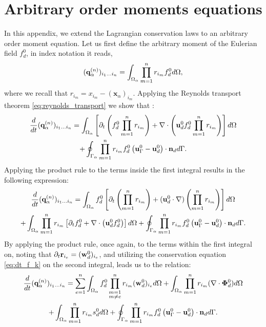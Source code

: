
\section{Arbitrary order moments equations}
\label{ap:Moments_equations}
In this appendix, we extend the Lagrangian conservation laws to an arbitrary order moment equation. 
Let us first define the arbitrary moment of the Eulerian field $f_d^0$, in index notation it reads, 
\begin{equation*}
    (\textbf{q}_\alpha^{(n)})_{i_1\ldots i_n}
    = \int_{\Omega_{\alpha}} 
    \prod_{m=1}^{n} r_{i_m} f_d^0 
     d\Omega, 
\end{equation*}
where we recall that $r_{i_m} = x_{i_m} - (\textbf{x}_\alpha)_{i_m}$. 
Applying the Reynolds transport theorem \eqref{eq:reynolds_transport} we show that :
\begin{multline}
    \frac{d}{dt} {(\textbf{q}_\alpha^{(n)})_{i_1\ldots i_n}}
    =\int_{\Omega_{\alpha}} 
        \left[ \partial_t \left(f_d^0 \prod_{m=1}^{n} r_{i_m}\right) 
    + \mathbf{\nabla}\cdot \left(\textbf{u}_d^0 f_d^0 \prod_{m=1}^{n} r_{i_m}\right) \right]
     d\Omega\\
    +\oint_{\Gamma_{\alpha}}  \prod_{m=1}^{n} r_{i_m} f_d^0 \left(\textbf{u}_\Gamma^0 - \textbf{u}_d^0\right)\cdot \textbf{n}_d  d\Gamma. 
\end{multline}
Applying the product rule to the terms inside the first integral results in the following expression: 
\begin{multline}
    \frac{d}{dt} {(\textbf{q}_\alpha^{(n)})_{i_1\ldots i_n}}
    =\int_{\Omega_{\alpha}}  
        f_d^0 \left[ \partial_t \left(\prod_{m=1}^{n} r_{i_m}\right) 
        + (\textbf{u}_d^0\cdot \mathbf{\nabla}) \left( \prod_{m=1}^{n} r_{i_m}\right) \right]
     d\Omega\\
    +\int_{\Omega_{\alpha}}  
        \prod_{m=1}^{n} r_{i_m} 
        \left[ \partial_t f_d^0
    +  \mathbf{\nabla}\cdot \left(\textbf{u}_d^0 f_d^0 \right) \right]
     d\Omega
    +\oint_{\Gamma_{\alpha}}  \prod_{m=1}^{n} r_{i_m} f_d^0 \left(\textbf{u}_\Gamma^0 - \textbf{u}_d^0\right)\cdot \textbf{n}_d  d\Gamma. 
\end{multline}
By applying the product rule, once again, to the terms within the first integral on, noting that $\partial_t \textbf{r}_{i_e} = (\textbf{w}_d^0)_{i_e}$, and utilizing the conservation equation \eqref{eq:dt_f_k} on the second integral, leads us to the relation: 
\begin{multline}
    \frac{d}{dt} {(\textbf{q}_\alpha^{(n)})_{i_1\ldots i_n}}
    = \sum_{e=1}^{n} \int_{\Omega_{\alpha}}  
        f_d^0 \prod^{n}_{\substack{ m=1 \\   m \neq e}} r_{i_m} (\textbf{w}_d^0)_{i_e}
         d\Omega
    +\int_{\Omega_{\alpha}} \prod_{m=1}^{n} r_{i_m} (\mathbf{\nabla}\cdot\bm{\Phi}_d^0) d\Omega\\
    + \int_{\Omega_{\alpha}}  \prod_{m=1}^{n} r_{i_m} s_d^0 d\Omega
    +\oint_{\Gamma_{\alpha}}  \prod_{m=1}^{n} r_{i_m} f_d^0 \left(\textbf{u}_\Gamma^0 - \textbf{u}_d^0\right)\cdot \textbf{n}_d  d\Gamma.
\end{multline}
